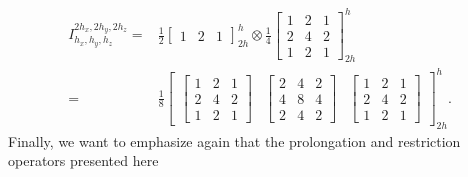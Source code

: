 \begin{equation}
	\begin{split}
		I_{h_x, h_y, h_z}^{2h_x, 2h_y, 2h_z} = & \frac{1}{2} \begin{bmatrix}
			1 & 2 & 1
		\end{bmatrix}_{2h}^{h} \otimes 
		\frac{1}{4} 
		\begin{bmatrix}
			1 & 2 & 1 \\
			2 & 4 & 2 \\
			1 & 2 & 1
		\end{bmatrix}_{2h}^{h} \\
		= & \frac{1}{8} \begin{bmatrix}
			\begin{bmatrix}
				1 & 2 & 1 \\
				2 & 4 & 2 \\
				1 & 2 & 1
			\end{bmatrix}&	\begin{bmatrix}
				2 & 4 & 2 \\
				4 & 8 & 4 \\
				2 & 4 & 2
			\end{bmatrix} &
			\begin{bmatrix}
				1 & 2 & 1 \\
				2 & 4 & 2 \\
				1 & 2 & 1
			\end{bmatrix}
		\end{bmatrix}_{2h}^{h} .
	\end{split}
\end{equation}
Finally, we want to emphasize again that the prolongation and restriction operators presented here

